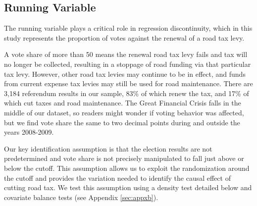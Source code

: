 










\subsection{Running Variable}

The running variable plays a critical role in regression discontinuity, which in this study represents the proportion of votes against the renewal of a road tax levy. 

A vote share of more than 50 means the renewal road tax levy fails and tax will no longer be collected, resulting in a stoppage of road funding via that particular tax levy. However, other road tax levies may continue to be in effect, and funds from current expense tax levies may still be used for road maintenance. There are 3,184 referendum results in our sample, 83\% of which renew the tax, and 17\% of which cut taxes and road maintenance. The Great Financial Crisis falls in the middle of our dataset, so readers might wonder if voting behavior was affected, but we find vote share the same to two decimal points during and outside the years 2008-2009. 

Our key identification assumption is that the election results are not predetermined and vote share is not precisely manipulated to fall just above or below the cutoff. This assumption allows us to exploit the randomization around the cutoff and provides the variation needed to identify the causal effect of cutting road tax. We test this assumption using a density test detailed below and covariate balance tests (see Appendix \ref{sec:appxb}).

